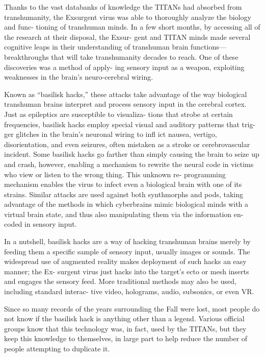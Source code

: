 Thanks to the vast databanks of knowledge the TITANs 
had absorbed from transhumanity, the Exsurgent virus 
was able to thoroughly analyze the biology and func-
tioning of transhuman minds. In a few short months, by 
accessing all of the research at their disposal, the Exsur-
gent and TITAN minds made several cognitive leaps in 
their understanding of transhuman brain functions—
breakthroughs that will take transhumanity decades to 
reach. One of these discoveries was a method of apply-
ing sensory input as a weapon, exploiting weaknesses 
in the brain's neuro-cerebral wiring.

Known as ``basilisk hacks,'' these attacks take 
advantage of the way biological transhuman brains 
interpret and process sensory input in the cerebral 
cortex. Just as epileptics are susceptible to visualiza-
tions that strobe at certain frequencies, basilisk hacks 
employ special visual and auditory patterns that trig-
ger glitches in the brain's neuronal wiring to infl ict 
nausea, vertigo, disorientation, and even seizures, 
often mistaken as a stroke or cerebrovascular incident. 
Some basilisk hacks go farther than simply causing 
the brain to seize up and crash, however, enabling a 
mechanism to rewrite the neural code in victims who 
view or listen to the wrong thing. This unknown re-
programming mechanism enables the virus to infect 
even a biological brain with one of its strains. Similar 
attacks are used against both synthmorphs and pods, 
taking advantage of the methods in which cyberbrains 
mimic biological minds with a virtual brain state, and 
thus also manipulating them via the information en-
coded in sensory input.

In a nutshell, basilisk hacks are a way of hacking 
transhuman brains merely by feeding them a specific 
sample of sensory input, usually images or sounds. 
The widespread use of augmented reality makes 
deployment of such hacks an easy manner; the Ex-
surgent virus just hacks into the target's ecto or mesh 
inserts and engages the sensory feed. More traditional 
methods may also be used, including standard interac-
tive video, holograms, audio, subsonics, or even VR.

Since so many records of the years surrounding 
the Fall were lost, most people do not know if the 
basilisk hack is anything other than a legend. Various 
official groups know that this technology was, in fact, 
used by the TITANs, but they keep this knowledge to 
themselves, in large part to help reduce the number of 
people attempting to duplicate it. 

